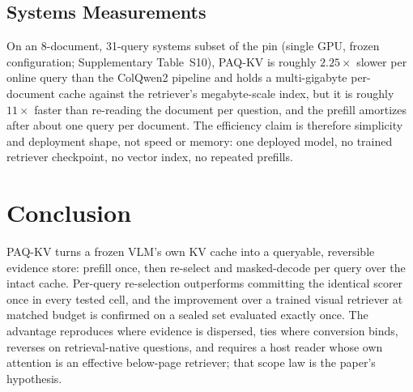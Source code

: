 \documentclass[letterpaper]{article} %
\newcommand{\paqc}{\textsc{PAQ-KV}}
\begin{document}
\subsection{Systems Measurements}\label{sec:results-efficiency}
On an 8-document, 31-query systems subset of the pin (single GPU, frozen
configuration; Supplementary Table~S10), \paqc{} is roughly $2.25\times$ slower per
online query than the ColQwen2 pipeline and holds a multi-gigabyte
per-document cache against the retriever's megabyte-scale index, but it is
roughly $11\times$ faster than re-reading the document per question, and
the prefill amortizes after about one query per document. The
efficiency claim is therefore simplicity and deployment shape, not speed or
memory: one deployed model, no trained retriever checkpoint, no vector
index, no repeated prefills.

\section{Conclusion}
\paqc{} turns a frozen VLM's own KV cache into a queryable, reversible
evidence store: prefill once, then re-select and masked-decode per query
over the intact cache. Per-query re-selection outperforms committing the
identical scorer once in every tested cell, and the improvement over a
trained visual retriever at matched budget is confirmed on a sealed set
evaluated exactly once. The advantage reproduces where evidence is
dispersed, ties where conversion binds, reverses on retrieval-native
questions, and requires a host reader whose own attention is an effective
below-page retriever; that scope law is the paper's hypothesis.


\end{document}
